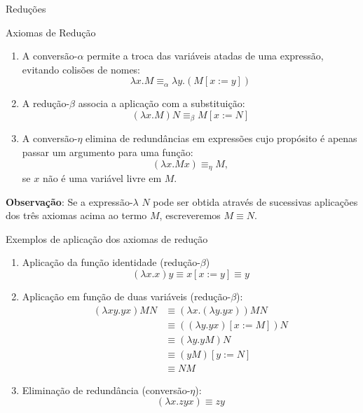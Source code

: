 \begin{frame}[fragile]{Reduções}

    \begin{block}{Axiomas de Redução}
        \begin{enumerate}
            \item A conversão-$\alpha$ permite a troca das variáveis atadas de uma expressão,
            evitando colisões de nomes:
            \[
                \lambda x.M \equiv_\alpha \lambda y.(M[x:=y])
            \]

            \item A redução-$\beta$ associa a aplicação com a substituição:
            \[
                (\lambda x.M)N \equiv_\beta M[x:=N]
            \]

            \item A  conversão-$\eta$ elimina de redundâncias em expressões cujo
                propósito é apenas passar um argumento para uma função:
            \[
                (\lambda x.Mx) \equiv_\eta M,
            \]
            se $x$ não é uma variável livre em $M$.
        \end{enumerate}
    \end{block}

    \textbf{Observação}: Se a expressão-$\lambda$ $N$ pode ser obtida através de sucessivas 
        aplicações dos três axiomas acima ao termo $M$, escreveremos $M\equiv N$.
\end{frame}

\begin{frame}[fragile]{Exemplos de aplicação dos axiomas de redução}

    \begin{enumerate}
        \item Aplicação da função identidade (redução-$\beta$)
        \[
            (\lambda x.x)y \equiv x[x:=y] \equiv y
        \]

        \item Aplicação em função de duas variáveis (redução-$\beta$):
        \begin{align*}
            (\lambda xy.yx)MN & \equiv (\lambda x.(\lambda y.yx))MN \\
            & \equiv ((\lambda y.yx)[x:=M])N \\
            & \equiv (\lambda y.yM)N \\
            & \equiv (yM)[y:=N] \\
            & \equiv NM
        \end{align*}

        \item Eliminação de redundância (conversão-$\eta$):
        \[
            (\lambda x.zyx) \equiv zy
        \]
    \end{enumerate}

\end{frame}

